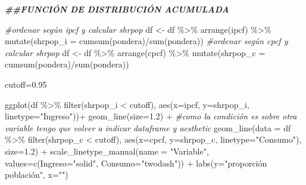 \documentclass[
]{book}
\newenvironment{Shaded}{\begin{snugshade}}{\end{snugshade}}
\newcommand{\AttributeTok}[1]{\textcolor[rgb]{0.77,0.63,0.00}{#1}}
\newcommand{\CommentTok}[1]{\textcolor[rgb]{0.56,0.35,0.01}{\textit{#1}}}
\newcommand{\DocumentationTok}[1]{\textcolor[rgb]{0.56,0.35,0.01}{\textbf{\textit{#1}}}}
\newcommand{\FloatTok}[1]{\textcolor[rgb]{0.00,0.00,0.81}{#1}}
\newcommand{\FunctionTok}[1]{\textcolor[rgb]{0.00,0.00,0.00}{#1}}
\newcommand{\NormalTok}[1]{#1}
\newcommand{\OtherTok}[1]{\textcolor[rgb]{0.56,0.35,0.01}{#1}}
\newcommand{\SpecialCharTok}[1]{\textcolor[rgb]{0.00,0.00,0.00}{#1}}
\newcommand{\StringTok}[1]{\textcolor[rgb]{0.31,0.60,0.02}{#1}}
\begin{document}
\begin{Shaded}
\begin{Highlighting}[]
\DocumentationTok{\#\#FUNCIÓN DE DISTRIBUCIÓN ACUMULADA}

\CommentTok{\#ordenar según ipcf y calcular shrpop}
\NormalTok{df }\OtherTok{\textless{}{-}}\NormalTok{ df }\SpecialCharTok{\%\textgreater{}\%} \FunctionTok{arrange}\NormalTok{(ipcf) }\SpecialCharTok{\%\textgreater{}\%} \FunctionTok{mutate}\NormalTok{(}\AttributeTok{shrpop\_i =} \FunctionTok{cumsum}\NormalTok{(pondera)}\SpecialCharTok{/}\FunctionTok{sum}\NormalTok{(pondera))}
\CommentTok{\#ordenar según cpcf y calcular shrpop}
\NormalTok{df }\OtherTok{\textless{}{-}}\NormalTok{ df }\SpecialCharTok{\%\textgreater{}\%} \FunctionTok{arrange}\NormalTok{(cpcf) }\SpecialCharTok{\%\textgreater{}\%} \FunctionTok{mutate}\NormalTok{(}\AttributeTok{shrpop\_c =} \FunctionTok{cumsum}\NormalTok{(pondera)}\SpecialCharTok{/}\FunctionTok{sum}\NormalTok{(pondera))}

\NormalTok{cutoff}\OtherTok{=}\FloatTok{0.95}

\FunctionTok{ggplot}\NormalTok{(df }\SpecialCharTok{\%\textgreater{}\%} \FunctionTok{filter}\NormalTok{(shrpop\_i }\SpecialCharTok{\textless{}}\NormalTok{ cutoff), }\FunctionTok{aes}\NormalTok{(}\AttributeTok{x=}\NormalTok{ipcf, }\AttributeTok{y=}\NormalTok{shrpop\_i, }\AttributeTok{linetype=}\StringTok{"Ingreso"}\NormalTok{))}\SpecialCharTok{+}
    \FunctionTok{geom\_line}\NormalTok{(}\AttributeTok{size=}\FloatTok{1.2}\NormalTok{) }\SpecialCharTok{+}
    \CommentTok{\#como la condición es sobre otra variable tengo que volver a indicar dataframe y aesthetic }
    \FunctionTok{geom\_line}\NormalTok{(}\AttributeTok{data =}\NormalTok{ df }\SpecialCharTok{\%\textgreater{}\%} \FunctionTok{filter}\NormalTok{(shrpop\_c }\SpecialCharTok{\textless{}}\NormalTok{ cutoff), }\FunctionTok{aes}\NormalTok{(}\AttributeTok{x=}\NormalTok{cpcf, }\AttributeTok{y=}\NormalTok{shrpop\_c, }\AttributeTok{linetype=}\StringTok{"Consumo"}\NormalTok{), }\AttributeTok{size=}\FloatTok{1.2}\NormalTok{) }\SpecialCharTok{+}
    \FunctionTok{scale\_linetype\_manual}\NormalTok{(}\AttributeTok{name =} \StringTok{"Variable"}\NormalTok{, }\AttributeTok{values=}\FunctionTok{c}\NormalTok{(}\AttributeTok{Ingreso=}\StringTok{"solid"}\NormalTok{, }\AttributeTok{Consumo=}\StringTok{"twodash"}\NormalTok{)) }\SpecialCharTok{+}
    \FunctionTok{labs}\NormalTok{(}\AttributeTok{y=}\StringTok{"proporción población"}\NormalTok{, }\AttributeTok{x=}\StringTok{""}\NormalTok{)}
\end{Highlighting}
\end{Shaded}
\end{document}

